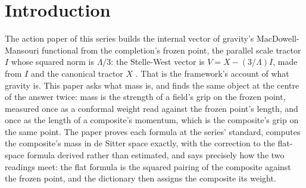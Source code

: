 \documentclass[11pt]{article}
\theoremstyle{definition}
\theoremstyle{plain}
\begin{document}
\noindent{}
\newpage

\section{Introduction}

\label{c:note.mass.setting-introduction}
The action paper of this series builds the internal vector of gravity's MacDowell-Mansouri functional from the completion's frozen point, the parallel scale tractor $I$ whose squared norm is $\Lambda/3$: the Stelle-West vector is $V = X - (3/\Lambda)I$, made from $I$ and the canonical tractor $X$ \cite{ButlerT10}. That is the framework's account of what gravity is. This paper asks what mass is, and finds the same object at the centre of the answer twice: mass is the strength of a field's grip on the frozen point, measured once as a conformal weight read against the frozen point's length, and once as the length of a composite's momentum, which is the composite's grip on the same point. The paper proves each formula at the series' standard, computes the composite's mass in de Sitter space exactly, with the correction to the flat-space formula derived rather than estimated, and says precisely how the two readings meet: the flat formula is the squared pairing of the composite against the frozen point, and the dictionary then assigns the composite its weight.
\end{document}
